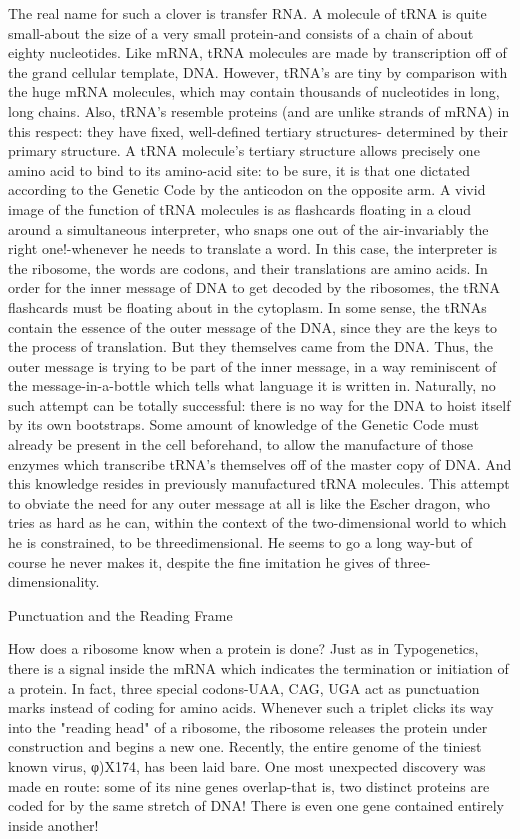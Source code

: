 {The real name for such a clover is transfer RNA. A molecule of tRNA is quite small-about
the size of a very small protein-and consists of a chain of about eighty nucleotides. Like
mRNA, tRNA molecules are made by transcription off of the grand cellular template, DNA.
However, tRNA's are tiny by comparison with the huge mRNA molecules, which may
contain thousands of nucleotides in long, long chains. Also, tRNA's resemble proteins (and
are unlike strands of mRNA) in this respect: they have fixed, well-defined tertiary structures-
determined by their primary structure. A tRNA molecule's tertiary structure allows precisely
one amino acid to bind to its amino-acid site: to be sure, it is that one dictated according to
the Genetic Code by the anticodon on the opposite arm. A vivid image of the function of
tRNA molecules is as flashcards floating in a cloud around a simultaneous interpreter, who
snaps one out of the air-invariably the right one!-whenever he needs to translate a word. In
this case, the interpreter is the ribosome, the words are codons, and their translations are
amino acids.
         In order for the inner message of DNA to get decoded by the ribosomes, the tRNA
flashcards must be floating about in the cytoplasm. In some sense, the tRNAs contain the
essence of the outer message of the DNA, since they are the keys to the process of
translation. But they themselves came from the DNA. Thus, the outer message is trying to be
part of the inner message, in a way reminiscent of the message-in-a-bottle which tells what
language it is written in. Naturally, no such attempt can be totally successful: there is no way
for the DNA to hoist itself by its own bootstraps. Some amount of knowledge of the Genetic
Code must already be present in the cell beforehand, to allow the manufacture of those
enzymes which transcribe tRNA's themselves off of the master copy of DNA. And this
knowledge resides in previously manufactured tRNA molecules. This attempt to obviate the
need for any outer message at all is like the Escher dragon, who tries as hard as he can,
within the context of the two-dimensional world to which he is constrained, to be
threedimensional. He seems to go a long way-but of course he never makes it, despite the
fine imitation he gives of three-dimensionality.

                            Punctuation and the Reading Frame

How does a ribosome know when a protein is done? Just as in Typogenetics, there is a signal
inside the mRNA which indicates the termination or initiation of a protein. In fact, three
special codons-UAA, CAG, UGA act as punctuation marks instead of coding for amino
acids. Whenever such a triplet clicks its way into the "reading head" of a ribosome, the
ribosome releases the protein under construction and begins a new one.
        Recently, the entire genome of the tiniest known virus, φ)X174, has been laid bare.
One most unexpected discovery was made en route: some of its nine genes overlap-that is,
two distinct proteins are coded for by the same stretch of DNA! There is even one gene
contained entirely inside another!




}
